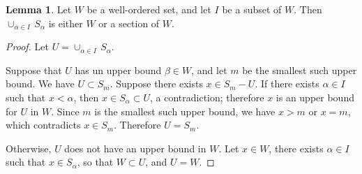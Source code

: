 \documentclass[11pt,a4paper,twoside]{article}
\theoremstyle{definition}
\newtheorem{lemma}{Lemma}
\begin{document}
\bigskip
\begin{lemma}\label{lemma:union_of_sections}
  Let $W$ be a well-ordered set, and let $I$ be a subset of $W$. Then $\cup_{\alpha \in I} \,S_\alpha$ is
  either $W$ or a section of $W$.
\end{lemma}

\begin{proof}
  Let $U = \cup_{\alpha \in I} \,S_\alpha$.

  Suppose that $U$ has un upper bound $\beta \in W$, and let $m$ be the smallest such upper bound.
  We have $U \subset S_m$. Suppose there exists $x \in S_m - U$. If there exists $\alpha \in I$
  such that $x < \alpha$, then $x \in S_\alpha \subset U$, a contradiction; therefore $x$ is an upper bound
  for $U$ in $W$. Since $m$ is the smallest such upper bound, we have $x > m$ or $x = m$,
  which contradicts $x \in S_m$. Therefore $U = S_m$.

  Otherwise, $U$ does not have an upper bound in $W$. Let $x \in W$, there exists $\alpha \in I$ such
  that $x \in S_\alpha$, so that $W \subset U$, and $U = W$.
\end{proof}
\end{document}

